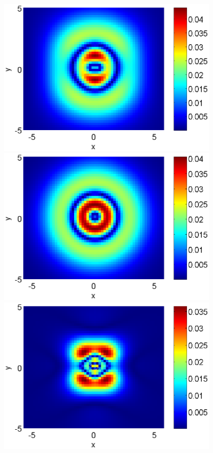 \documentclass[preprint]{elsarticle}
\begin{document}
\begin{figure}[htbp]
	\begin{minipage}[b]{0.5\linewidth}
		\raggedleft
		\includegraphics[width=\linewidth]{differences/difference_c=03_beta=1.eps}
	\end{minipage}
	\begin{minipage}[b]{0.5\linewidth}
		 \raggedright
		\includegraphics[width=\linewidth]{differences/difference_c=01_beta=1.eps}
	\end{minipage}
	\begin{minipage}[b]{0.5\linewidth}
		\raggedleft
		 \includegraphics[width=\linewidth]{differences/difference_c=03_beta=3.eps}

\end{minipage}
\end{figure}
\end{document}
